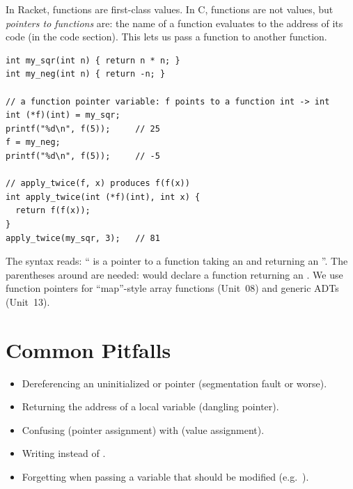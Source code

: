 In Racket, functions are first-class values. In C, functions are not values, but \emph{pointers
to functions} are: the name of a function evaluates to the address of its code (in the code
section). This lets us pass a function to another function.
\begin{lstlisting}[style=c]
int my_sqr(int n) { return n * n; }
int my_neg(int n) { return -n; }

// a function pointer variable: f points to a function int -> int
int (*f)(int) = my_sqr;
printf("%d\n", f(5));     // 25
f = my_neg;
printf("%d\n", f(5));     // -5

// apply_twice(f, x) produces f(f(x))
int apply_twice(int (*f)(int), int x) {
  return f(f(x));
}
apply_twice(my_sqr, 3);   // 81
\end{lstlisting}
\begin{center}
\end{center}
The syntax  reads: `` is a pointer to a function taking an
 and returning an ''. The parentheses around  are needed:
 would declare a function returning an . We use function pointers
for ``map''-style array functions (Unit~08) and generic ADTs (Unit~13).

\section{Common Pitfalls}
\begin{itemize}
  \item Dereferencing an uninitialized or  pointer (segmentation fault or worse).
  \item Returning the address of a local variable (dangling pointer).
  \item Confusing  (pointer assignment) with  (value assignment).
  \item Writing  instead of .
  \item Forgetting \code{\&} when passing a variable that should be modified
    (e.g.\ ).
\end{itemize}

